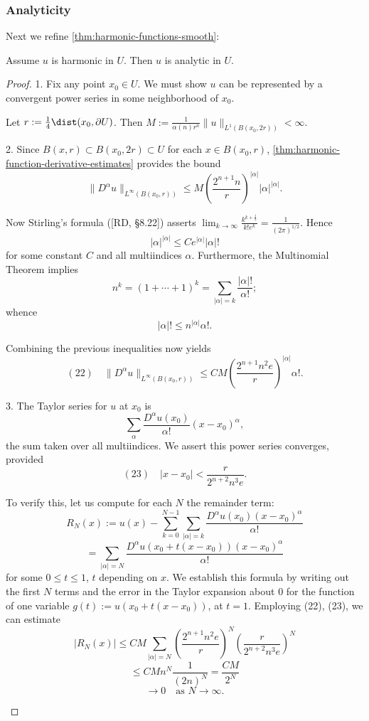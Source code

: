 \subsubsection{Analyticity}
\label{sec:laplace-analyticity}

Next we refine \cref{thm:harmonic-functions-smooth}:

\begin{theorem}[Analyticity]
\label{thm:harmonic-functions-analytic}
Assume $u$ is harmonic in $U$. Then $u$ is analytic in $U$.
\end{theorem}

\begin{proof}
1. Fix any point $x_0 \in U$. We must show $u$ can be represented by a convergent power series in some neighborhood of $x_0$.

Let $r := \frac14\dist(x_0,\partial U)$. Then $M := \frac{1}{\alpha(n)r^n}\|u\|_{L^1(B(x_0,2r))} < \infty$.

2. Since $B(x,r) \subset B(x_0,2r) \subset U$ for each $x \in B(x_0,r)$, \cref{thm:harmonic-function-derivative-estimates} provides the bound
$$\|D^\alpha u\|_{L^\infty(B(x_0,r))} \leq M\left(\frac{2^{n+1}n}{r}\right)^{|\alpha|}|\alpha|^{|\alpha|}.$$

Now Stirling's formula ([RD, \S8.22]) asserts $\lim_{k\to\infty} \frac{k^{k+\frac12}}{k!e^k} = \frac{1}{(2\pi)^{1/2}}$. Hence
$$|\alpha|^{|\alpha|} \leq Ce^{|\alpha|}|\alpha|!$$
for some constant $C$ and all multiindices $\alpha$. Furthermore, the Multinomial Theorem implies
$$n^k = (1+\cdots+1)^k = \sum_{|\alpha|=k} \frac{|\alpha|!}{\alpha!};$$
whence
$$|\alpha|! \leq n^{|\alpha|}\alpha!.$$

Combining the previous inequalities now yields
$$(22) \quad \|D^\alpha u\|_{L^\infty(B(x_0,r))} \leq CM\left(\frac{2^{n+1}n^2e}{r}\right)^{|\alpha|}\alpha!.$$

3. The Taylor series for $u$ at $x_0$ is
$$\sum_{\alpha} \frac{D^\alpha u(x_0)}{\alpha!}(x-x_0)^\alpha,$$
the sum taken over all multiindices. We assert this power series converges, provided
$$(23) \quad |x - x_0| < \frac{r}{2^{n+2}n^3 e}.$$

To verify this, let us compute for each $N$ the remainder term:
$$R_N(x) := u(x) - \sum_{k=0}^{N-1} \sum_{|\alpha|=k} \frac{D^\alpha u(x_0)(x - x_0)^\alpha}{\alpha!}$$
$$= \sum_{|\alpha|=N} \frac{D^\alpha u(x_0 + t(x - x_0))(x - x_0)^\alpha}{\alpha!}$$
for some $0 \le t \le 1$, $t$ depending on $x$. We establish this formula by writing out the first $N$ terms and the error in the Taylor expansion about $0$ for the function of one variable $g(t) := u(x_0 + t(x - x_0))$, at $t = 1$. Employing (22), (23), we can estimate
$$|R_N(x)| \le CM \sum_{|\alpha|=N} \left(\frac{2^{n+1} n^2 e}{r}\right)^N \left(\frac{r}{2^{n+2}n^3 e}\right)^N$$
$$\le CMn^N \frac{1}{(2n)^N} = \frac{CM}{2^N}$$
$$\to 0 \quad \text{as } N \to \infty.$$

\begin{figure}[h]\centering
\end{figure}
\end{proof}

